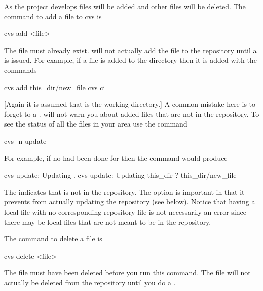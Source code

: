 As the project develops files will be added and other files will be
deleted. The command to add a file to cvs is
\begin{example}
  cvs add <file>
\end{example}
The file must already exist. \cvs will not actually add the file to
the repository until a  is issued. For example, if a file
 is added to the  directory then it is added
with the commands
\begin{example}
  cvs add this_dir/new_file
  cvs ci
\end{example}
[Again it is assumed that  is the working directory.] A common
mistake here is to forget to a .  will not warn
you about added files that are not in the repository. To see the
status of all the files in your area use the command
\begin{example}
  cvs -n update
\end{example}
For example, if no  had been done for  then
the  command would produce
\begin{example}
  cvs update: Updating .
  cvs update: Updating this_dir
  ? this_dir/new_file
\end{example}
The  indicates that  is not in the repository. The
 option is important in that it prevents  from actually
updating the repository (see below). Notice that having a local file
with no corresponding repository file is not necessarily an error
since there may be local files that are not meant to be in the
repository.

The command to delete a file is
\begin{example}
  cvs delete <file>
\end{example}
The file must have been deleted before you run this command. The file
will not actually be deleted from the repository until you do a
.

